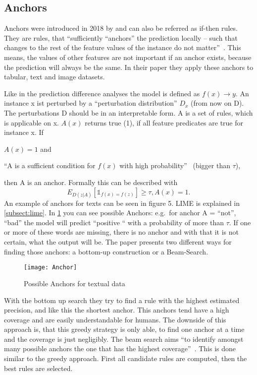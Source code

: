 \subsection{Anchors}
Anchors were introduced in 2018 by  and can also be referred as if-then rules. They are rules, that “sufficiently “anchors” the prediction locally – such that changes to the rest of the feature values of the instance do not matter”~\cite[1]{Ribeiro.2018}. This means, the values of other features are not important if an anchor exists, because the prediction will always be the same. In their paper they apply these anchors to tabular, text and image datasets.
\par
Like in the prediction difference analyses the model is defined as  
\(f(x) \rightarrow y\). 
An instance x ist perturbed by a “perturbation distribution” \(D_{x}\) (from now on D). The perturbations D should be in an interpretable form. A is a set of rules, which is applicable on x. \(A(x)\) returns true (1), if all feature predicates are true for instance x.
If
\begin{enumerate*}[label={\roman*)}]
    \item \(A(x) = 1\) and
    \item “A is a sufficient condition for \(f(x)\) with high probability”~\cite[2]{Ribeiro.2018} (bigger than \(\tau\)),
\end{enumerate*}
then A is an anchor. Formally this can be described with 
\[
    E_{D(z|A)} [\mathbb{1}_{f(x)=f(z)}] ≥ \tau, A(x) = 1.
\]
An example of anchors for texts can be seen in figure 5. LIME is explained in \cref{subsect:lime}. In \cref{fig:Anchor} you can see possible Anchors: e.g.\ for anchor A = {“not”, “bad”} the model will predict “positive “ with a probability of more than \(\tau\). If one or more of these words are missing, there is no anchor and with that it is not certain, what the output will be.
The paper presents two different ways for finding those anchors: a bottom-up construction or a Beam-Search.
\begin{figure}
    \center{}
    \texttt{[image: Anchor]}
    \caption{Possible Anchors for textual data~\cite{Ribeiro.2018}}\label{fig:Anchor}
\end{figure}
\par
With the bottom up search they try to find a rule with the highest estimated precision, and like this the shortest anchor. This anchors tend have a high coverage and are easily understandable for humans. 
The downside of this approach is, that this greedy strategy is only able, to find one anchor at a time and the coverage is just negligibly.
The beam search aims “to identify amongst many possible anchors the one that has the highest coverage”~\cite[5]{Ribeiro.2018}. This is done similar to the greedy approach. First all candidate rules are computed, then the best rules are selected.

